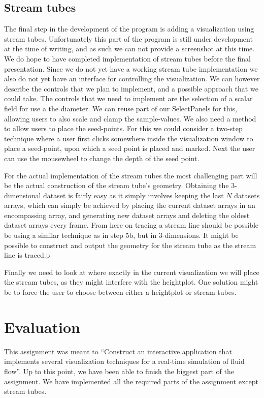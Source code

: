 \documentclass[a4paper,11pt,twoside]{report}
\begin{document}
	\section{Stream tubes}
		The final step in the development of the program is adding a visualization using stream tubes. Unfortunately this part of the program is still under development at the time of writing, and as such we can not provide a screenshot at this time. We do hope to have completed implementation of stream tubes before the final presentation.
		Since we do not yet have a working stream tube implementation we also do not yet have an interface for controlling the visualization. We can however describe the controls that we plan to implement, and a possible approach that we could take. The controls that we need to implement are the selection of a scalar field for use a the diameter. We can reuse part of our SelectPanels for this, allowing users to also scale and clamp the sample-values. We also need a method to allow users to place the seed-points. For this we could consider a two-step technique where a user first clicks somewhere inside the visualization window to place a seed-point, upon which a seed point is placed and marked. Next the user can use the mousewheel to change the depth of the seed point.

		For the actual implementation of the stream tubes the most challenging part will be the actual construction of the stream tube's geometry. Obtaining the 3-dimensional dataset is fairly easy as it simply involves keeping the last $N$ datasets arrays, which can simply be achieved by placing the current dataset arrays in an encompassing array, and generating new dataset arrays and deleting the oldest dataset arrays every frame. From here on tracing a stream line should be possible be using a similar technique as in step 5b, but in 3-dimensions. It might be possible to construct and output the geometry for the stream tube as the stream line is traced.p

		Finally we need to look at where exactly in the current visualization we will place the stream tubes, as they might interfere with the heightplot. One solution might be to force the user to choose between either a heightplot or stream tubes.
\chapter{Evaluation}
    This assignment was meant to ``Construct an interactive application that implements several visualization techniques for a real-time simulation of fluid flow''. Up to this point, we have been able to finish the biggest part of the assignment. We have implemented all the required parts of the assignment except stream tubes.
    
\end{document}
